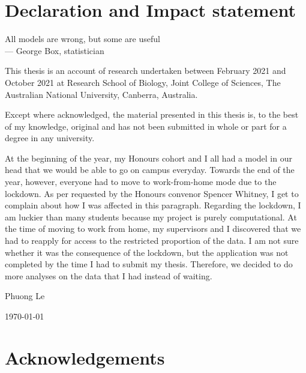
\chapter*{Declaration and Impact statement}


\begin{flushright}{    
All models are wrong, but some are useful \\} \medskip
--- George Box, statistician
\end{flushright}

\bigskip



This thesis is an account of research undertaken between February 2021 and  October 2021 at Research School of Biology, Joint College of Sciences, The Australian National University, Canberra, Australia.

Except where acknowledged, the material presented in this thesis is, to the best of my knowledge, original and has not been submitted in whole or part for a degree in any university.

At the beginning of the year, my Honours cohort and I all had a model in our head that we would be able to go on campus everyday. Towards the end of the year, however, everyone had to move to work-from-home mode due to the lockdown. As per requested by the Honours convenor Spencer Whitney, I get to complain about how I was affected in this paragraph. Regarding the lockdown, I am luckier than many students because my project is purely computational. At the time of moving to work from home, my supervisors and I discovered that we had to reapply for access to the restricted proportion of the data. I am not sure whether it was the consequence of the lockdown, but the application was not completed by the time I had to submit my thesis. Therefore, we decided to do more analyses on the data that I had instead of waiting.

\vspace{20mm}  %

\large
\hspace{12cm} Phuong Le\par
\hspace{12cm} \today

\normalsize
\chapter*{Acknowledgements}

